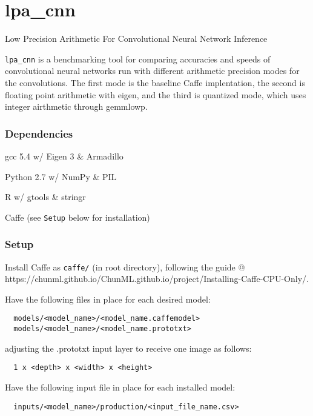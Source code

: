 \section{\texorpdfstring{\textbf{lpa\_cnn}}{lpa\_cnn}}\label{lpaux5fcnn}

Low Precision Arithmetic For Convolutional Neural Network Inference

\texttt{lpa\_cnn} is a benchmarking tool for comparing accuracies and
speeds of convolutional neural networks run with different arithmetic
precision modes for the convolutions. The first mode is the baseline
Caffe implentation, the second is floating point arithmetic with eigen,
and the third is quantized mode, which uses integer airthmetic through
gemmlowp.

\subsubsection{\texorpdfstring{\textbf{Dependencies}}{Dependencies}}\label{dependencies}

gcc 5.4 w/ Eigen 3 \& Armadillo

Python 2.7 w/ NumPy \& PIL

R w/ gtools \& stringr

Caffe (see \texttt{Setup} below for installation)

\subsubsection{\texorpdfstring{\textbf{Setup}}{Setup}}\label{setup}

Install Caffe as \texttt{caffe/} (in root directory), following the
guide @
https://chunml.github.io/ChunML.github.io/project/Installing-Caffe-CPU-Only/.

Have the following files in place for each desired model:

\begin{verbatim}
  models/<model_name>/<model_name.caffemodel>
  models/<model_name>/<model_name.prototxt>
\end{verbatim}

adjusting the .prototxt input layer to receive one image as follows:

\begin{verbatim}
  1 x <depth> x <width> x <height>
\end{verbatim}

Have the following input file in place for each installed model:

\begin{verbatim}
  inputs/<model_name>/production/<input_file_name.csv>
\end{verbatim}

